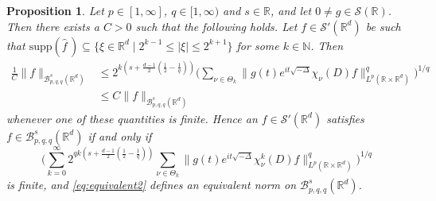 \documentclass{amsart}
\newtheorem{proposition}[theorem]{Proposition}
\theoremstyle{definition}
\newcommand{\R}{\mathbb{R}}
\newcommand{\N}{\mathbb{N}}
\newcommand {\Rd}{\mathbb{R}^{d}}
\newcommand {\Baspqq}{\mathcal{B}^{s}_{p,q,q}(\Rd)}
\newcommand {\supp}{\mathrm{supp}}
\newcommand{\wh}{\widehat}
\newcommand {\Sw}{\mathcal{S}}
\numberwithin{equation}{section}
\begin{document}
\begin{proposition}\label{prop:equivwave}
Let $p\in[1,\infty]$, $q\in[1,\infty)$ and $s \in \R$, and let $0\neq g\in\Sw(\R)$. Then there exists a $C>0$ such that the following holds. Let $f\in\Sw'(\Rd)$ be such that $\supp(\wh{f}\,)\subseteq\{\xi\in\Rd\mid 2^{k-1}\leq |\xi|\leq 2^{k+1}\}$ for some $k\in\N$. Then
\begin{align*}
\frac{1}{C}\|f\|_{\Baspqq}&\leq 2^{k(s+\frac{d-1}{2}(\frac{1}{2}-\frac{1}{q}))}\Big(\sum_{\nu\in\Theta_{k}}\|g(t)e^{it\sqrt{-\Delta}}\chi_{\nu}(D)f\|_{L^{p}(\R\times\Rd)}^{q}\Big)^{1/q}\\
&\leq C\|f\|_{\Baspqq}
\end{align*} 
whenever one of these quantities is finite. Hence an $f \in \Sw'(\Rd)$ satisfies $f\in\Baspqq$ if and only if 
\begin{equation}\label{eq:equivalent2}
\Big(\sum_{k=0}^{\infty}2^{qk(s+\frac{d-1}{2}( \frac{1}{2} - \frac{1}{q}))}\sum_{\nu\in\Theta_{k}}\| g(t)e^{it\sqrt{-\Delta}}\chi_\nu^{k}(D)f \|^q_{L^{p}(\R\times \Rd)}\Big)^{1/q}
\end{equation}
is finite, and \eqref{eq:equivalent2} defines an equivalent norm on $\Baspqq$.
\end{proposition}
\end{document}
